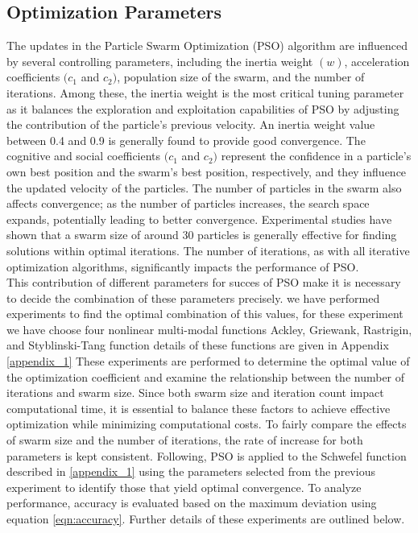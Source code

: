 \documentclass[paper,revised]{geophysics}
\begin{document}
\subsection{Optimization Parameters}
The updates in the Particle Swarm Optimization (PSO) algorithm are influenced by several controlling parameters, including the inertia weight \((w)\), acceleration coefficients \((c_1\) and \(c_2)\), population size of the swarm, and the number of iterations. Among these, the inertia weight is the most critical tuning parameter as it balances the exploration and exploitation capabilities of PSO by adjusting the contribution of the particle's previous velocity. An inertia weight value between 0.4 and 0.9 is generally found to provide good convergence. The cognitive and social coefficients \((c_1\) and \(c_2)\) represent the confidence in a particle's own best position and the swarm's best position, respectively, and they influence the updated velocity of the particles. The number of particles in the swarm also affects convergence; as the number of particles increases, the search space expands, potentially leading to better convergence. Experimental studies have shown that a swarm size of around 30 particles is generally effective for finding solutions within optimal iterations. The number of iterations, as with all iterative optimization algorithms, significantly impacts the performance of PSO.
\\
This contribution of different parameters for succes of PSO make it is necessary to decide the combination of these parameters precisely. we have performed experiments to find the optimal combination of this values, for these experiment we have choose four nonlinear multi-modal functions Ackley, Griewank, Rastrigin, and Styblinski-Tang function details of these functions are given in Appendix \cref{appendix_1} These experiments are performed to determine the optimal value of the optimization coefficient and examine the relationship between the number of iterations and swarm size. Since both swarm size and iteration count impact computational time, it is essential to balance these factors to achieve effective optimization while minimizing computational costs. To fairly compare the effects of swarm size and the number of iterations, the rate of increase for both parameters is kept consistent. Following, PSO is applied to the Schwefel function described in \ref{appendix_1} using the parameters selected from the previous experiment to identify those that yield optimal convergence. To analyze performance, accuracy is evaluated based on the maximum deviation using equation \ref{eqn:accuracy}. Further details of these experiments are outlined below.
\end{document}
